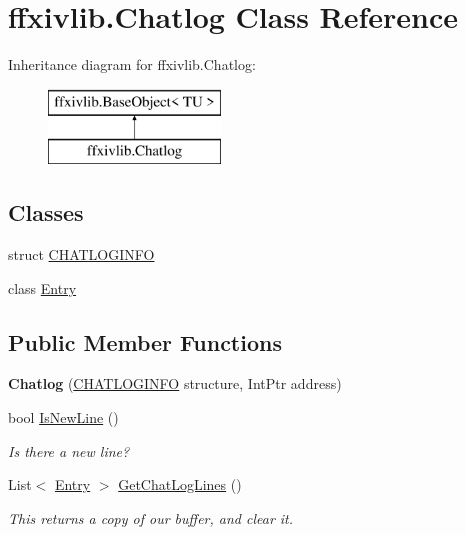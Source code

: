 \hypertarget{classffxivlib_1_1_chatlog}{\section{ffxivlib.\-Chatlog Class Reference}
\label{classffxivlib_1_1_chatlog}
}
Inheritance diagram for ffxivlib.\-Chatlog\-:\begin{figure}[H]
\begin{center}
\leavevmode
\includegraphics[height=2.000000cm]{classffxivlib_1_1_chatlog}
\end{center}
\end{figure}
\subsection*{Classes}
\begin{DoxyCompactItemize}
\item 
struct \hyperlink{structffxivlib_1_1_chatlog_1_1_c_h_a_t_l_o_g_i_n_f_o}{C\-H\-A\-T\-L\-O\-G\-I\-N\-F\-O}
\item 
class \hyperlink{classffxivlib_1_1_chatlog_1_1_entry}{Entry}
\end{DoxyCompactItemize}
\subsection*{Public Member Functions}
\begin{DoxyCompactItemize}
\item 
\hypertarget{classffxivlib_1_1_chatlog_af0e5c836454a8b7104c8ac43ead6f369}{{\bfseries Chatlog} (\hyperlink{structffxivlib_1_1_chatlog_1_1_c_h_a_t_l_o_g_i_n_f_o}{C\-H\-A\-T\-L\-O\-G\-I\-N\-F\-O} structure, Int\-Ptr address)}\label{classffxivlib_1_1_chatlog_af0e5c836454a8b7104c8ac43ead6f369}

\item 
bool \hyperlink{classffxivlib_1_1_chatlog_a1624b884b91cedd44e77b5635302bc97}{Is\-New\-Line} ()
\begin{DoxyCompactList}\small\item\em Is there a new line? \end{DoxyCompactList}\item 
List$<$ \hyperlink{classffxivlib_1_1_chatlog_1_1_entry}{Entry} $>$ \hyperlink{classffxivlib_1_1_chatlog_a30c40ddfca045bfb099c8243a81af1b6}{Get\-Chat\-Log\-Lines} ()
\begin{DoxyCompactList}\small\item\em This returns a copy of our buffer, and clear it. \end{DoxyCompactList}\end{DoxyCompactItemize}
